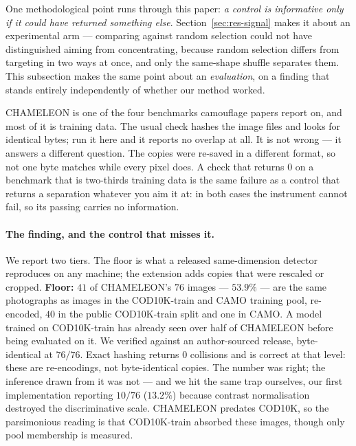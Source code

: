 \documentclass{article} %
\begin{document}
One methodological point runs through this paper: \emph{a control is informative only if it could
have returned something else}. Section~\ref{sec:res-signal} makes it about an experimental arm ---
comparing against random selection could not have distinguished aiming from concentrating, because
random selection differs from targeting in two ways at once, and only the same-shape shuffle
separates them. This subsection makes the same point about an \emph{evaluation}, on a finding that
stands entirely independently of whether our method worked.

CHAMELEON is one of the four benchmarks camouflage papers report on, and most of it is training
data. The usual check hashes the image files and looks for identical bytes; run it here and it
reports no overlap at all. It is not wrong --- it answers a different question. The copies were
re-saved in a different format, so not one byte matches while every pixel does. A check that returns
$0$ on a benchmark that is two-thirds training data is the same failure as a control that returns a
separation whatever you aim it at: in both cases the instrument cannot fail, so its passing carries
no information.

\paragraph{The finding, and the control that misses it.} We report two tiers. The floor is what a
released same-dimension detector reproduces on any machine; the extension adds copies that were
rescaled or cropped. \textbf{Floor:} $41$ of CHAMELEON's $76$ images ---
$53.9\%$ --- are the same photographs as images in the COD10K-train and CAMO training pool,
re-encoded, $40$ in the public COD10K-train split and one in CAMO. A model trained on COD10K-train
has already seen over half of CHAMELEON before being evaluated on it. We verified against an
author-sourced release, byte-identical at $76/76$. Exact hashing returns $0$ collisions and is
correct at that level: these are re-encodings, not byte-identical copies. The number was right; the
inference drawn from it was not --- and we hit the same trap ourselves, our first implementation
reporting $10/76$ ($13.2\%$) because contrast normalisation destroyed the discriminative scale.
CHAMELEON predates COD10K, so the parsimonious reading is that COD10K-train absorbed these images,
though only pool membership is measured.
\end{document}
